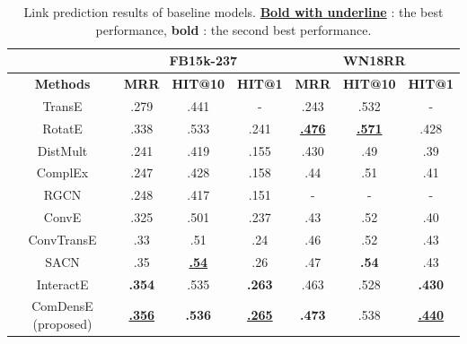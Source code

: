 \begin{table}[t]
\centering
\caption{Link prediction results of baseline models. \textbf{\underline{Bold with underline}} : the best performance, \textbf{bold} : the second best performance.}
\label{table5}
\begin{tabular}{cccc|ccc}
\hline
 & \multicolumn{3}{c}{\textbf{FB15k-237}} & \multicolumn{3}{c}{\textbf{WN18RR}}\\
 \hline
 \textbf{Methods} &
 \textbf{MRR} &
 \textbf{HIT@10} &
 \textbf{HIT@1} &
 \textbf{MRR} &
 \textbf{HIT@10} &
 \textbf{HIT@1} \\
 \hline
 TransE \cite{bordes2013translating} & .279 & .441  & - & .243 & .532 & -\\
 RotatE \cite{sun2019rotate} & .338 & .533 & .241 & \textbf{\underline{.476}} & \textbf{\underline{.571}} & .428\\
 \hline
 DistMult \cite{yang2014embedding} & .241 & .419 & .155 & .430 & .49 & .39\\
 ComplEx \cite{trouillon2016complex} & .247 & .428 & .158 & .44 & .51 & .41\\
 \hline
 RGCN \cite{schlichtkrull2018modeling} & .248 & .417 & .151 & - & - & -\\
 \hline
 ConvE \cite{dettmers2018convolutional} & .325 &  .501 & .237 & .43 & .52 & .40\\
 ConvTransE \cite{shang2019end} & .33 & .51 & .24 & .46 & .52 & .43\\
 SACN \cite{shang2019end} & .35 &  \textbf{\underline{.54}} & .26 & .47 & \textbf{.54} & .43\\
 InteractE \cite{vashishth2020interacte} & \textbf{.354} & .535 & \textbf{.263} & .463 & .528 & \textbf{.430}\\
 \hline
 ComDensE (proposed) & \textbf{\underline{.356}}  &  {\textbf{.536}} & \textbf{\underline{.265}} & \textbf{.473}  & .538 & \textbf{\underline{.440}}\\
 \hline
\end{tabular}
\end{table}

